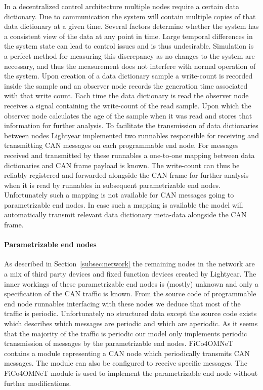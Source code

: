 In a decentralized control architecture multiple nodes require a certain data dictionary. Due to communication the system will contain multiple copies of that data dictionary at a given time. Several factors determine whether the system has a consistent view of the data at any point in time. Large temporal differences in the system state can lead to control issues and is thus undesirable. Simulation is a perfect method for measuring this discrepancy as no changes to the system are necessary, and thus the measurement does not interfere with normal operation of the system.
Upon creation of a data dictionary sample a write-count is recorded inside the sample and an observer node records the generation time associated with that write count. Each time the data dictionary is read the observer node receives a signal containing the write-count of the read sample. Upon which the observer node calculates the age of the sample when it was read and stores that information for further analysis. To facilitate the transmission of data dictionaries between nodes Lightyear implemented two runnables responsible for receiving and transmitting CAN messages on each programmable end node. For messages received and transmitted by these runnables a one-to-one mapping between data dictionaries and CAN frame payload is known. The write-count can thus be reliably registered and forwarded alongside the CAN frame for further analysis when it is read by runnables in subsequent parametrizable end nodes. Unfortunately such a mapping is not available for CAN messages going to parametrizable end nodes. In case such a mapping is available the model will automatically transmit relevant data dictionary meta-data alongside the CAN frame.

\paragraph{Parametrizable end nodes} As described in Section~\ref{subsec:network} the remaining nodes in the network are a mix of third party devices and fixed function devices created by Lightyear. The inner workings of these parametrizable end nodes is (mostly) unknown and only a specification of the CAN traffic is known. From the source code of programmable end node runnables interfacing with these nodes we deduce that most of the traffic is periodic. Unfortunately no structured data except the source code exists which describes which messages are periodic and which are aperiodic. As it seems that the majority of the traffic is periodic our model only implements periodic transmission of messages by the parametrizable end nodes. FiCo4OMNeT contains a module representing a CAN node which periodically transmits CAN messages. The module can also be configured to receive specific messages. The FiCo4OMNeT module is used to implement the parametrizable end node without further modifications.

